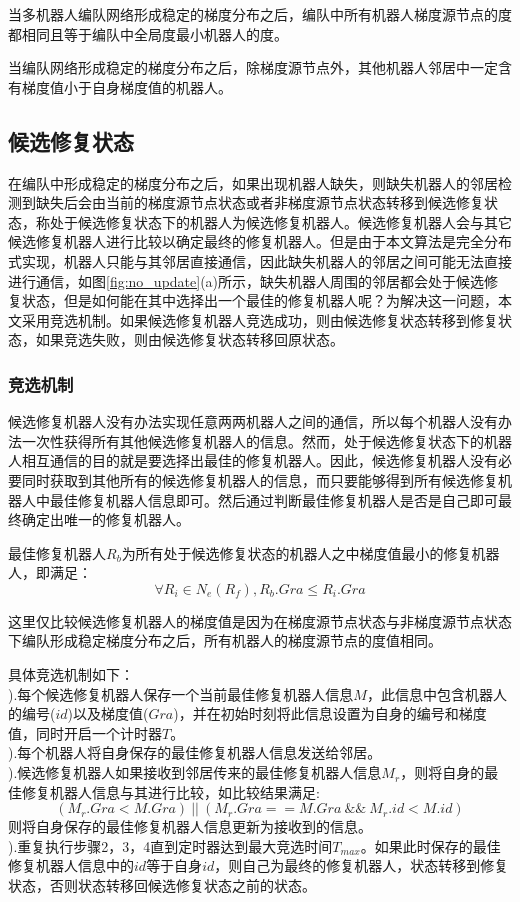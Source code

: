 \begin{cor}
	\label{cor:sourcegradient_leastdegree}
	当多机器人编队网络形成稳定的梯度分布之后，编队中所有机器人梯度源节点的度都相同且等于编队中全局度最小机器人的度。
\end{cor}

\begin{cor}
	\label{cor:neighbor_gradient}
	当编队网络形成稳定的梯度分布之后，除梯度源节点外，其他机器人邻居中一定含有梯度值小于自身梯度值的机器人。
\end{cor}

\subsection{候选修复状态}
在编队中形成稳定的梯度分布之后，如果出现机器人缺失，则缺失机器人的邻居检测到缺失后会由当前的梯度源节点状态或者非梯度源节点状态转移到候选修复状态，称处于候选修复状态下的机器人为候选修复机器人。候选修复机器人会与其它候选修复机器人进行比较以确定最终的修复机器人。但是由于本文算法是完全分布式实现，机器人只能与其邻居直接通信，因此缺失机器人的邻居之间可能无法直接进行通信，如图\ref{fig:no_update}(a)所示，缺失机器人周围的邻居都会处于候选修复状态，但是如何能在其中选择出一个最佳的修复机器人呢？为解决这一问题，本文采用竞选机制。如果候选修复机器人竞选成功，则由候选修复状态转移到修复状态，如果竞选失败，则由候选修复状态转移回原状态。

\subsubsection{竞选机制}
候选修复机器人没有办法实现任意两两机器人之间的通信，所以每个机器人没有办法一次性获得所有其他候选修复机器人的信息。然而，处于候选修复状态下的机器人相互通信的目的就是要选择出最佳的修复机器人。因此，候选修复机器人没有必要同时获取到其他所有的候选修复机器人的信息，而只要能够得到所有候选修复机器人中最佳修复机器人信息即可。然后通过判断最佳修复机器人是否是自己即可最终确定出唯一的修复机器人。
\begin{defn}
	最佳修复机器人$R_b$为所有处于候选修复状态的机器人之中梯度值最小的修复机器人，即满足：
	\[
		\forall R_i \in N_e(R_f), R_b.Gra \leq R_i.Gra
	\]
\end{defn}
这里仅比较候选修复机器人的梯度值是因为在梯度源节点状态与非梯度源节点状态下编队形成稳定梯度分布之后，所有机器人的梯度源节点的度值相同。

具体竞选机制如下：\\
).每个候选修复机器人保存一个当前最佳修复机器人信息$M$，此信息中包含机器人的编号($id$)以及梯度值($Gra$)，并在初始时刻将此信息设置为自身的编号和梯度值，同时开启一个计时器$T$。\\
).每个机器人将自身保存的最佳修复机器人信息发送给邻居。\\
).候选修复机器人如果接收到邻居传来的最佳修复机器人信息$M_r$，则将自身的最佳修复机器人信息与其进行比较，如比较结果满足:
\[
	(M_r.Gra < M.Gra)\ ||\ (M_r.Gra == M.Gra\ \&\& \  M_r.id < M.id) 
\]
则将自身保存的最佳修复机器人信息更新为接收到的信息。\\
).重复执行步骤2，3，4直到定时器达到最大竞选时间$T_{max}$。如果此时保存的最佳修复机器人信息中的$id$等于自身$id$，则自己为最终的修复机器人，状态转移到修复状态，否则状态转移回候选修复状态之前的状态。

